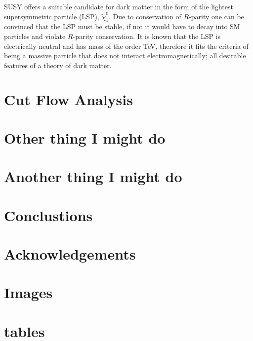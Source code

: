 \documentclass[11pt, oneside]{article}
\begin{document}
SUSY offers a suitable candidate for dark matter in the form of the lightest supersymmetric particle (LSP), $\tilde\chi^{0}_{1}$.
Due to conservation of $R$-parity one can be convinced that the LSP must be stable, if not it would have to decay into SM particles and violate $R$-parity conservation.
It is known that the LSP is electrically neutral and has mass of the order TeV, therefore it fits the criteria of being a massive particle that does not interact electromagnetically; all desirable features of a theory of dark matter.


















\clearpage
\section{Cut Flow Analysis}

\clearpage
\section{Other thing I might do}

\clearpage
\section{Another thing I might do}

\clearpage
\section{Conclustions}

\clearpage
\section{Acknowledgements}

\clearpage






\clearpage
\appendix
\section{Images}
\section{tables}
\end{document}
